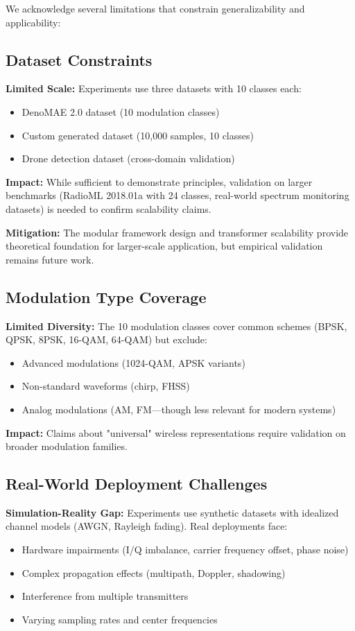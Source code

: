 We acknowledge several limitations that constrain generalizability and applicability:

\subsection{Dataset Constraints}

\textbf{Limited Scale:} Experiments use three datasets with 10 classes each:
\begin{itemize}
    \item DenoMAE 2.0 dataset (10 modulation classes)
    \item Custom generated dataset (10,000 samples, 10 classes)
    \item Drone detection dataset (cross-domain validation)
\end{itemize}

\textbf{Impact:} While sufficient to demonstrate principles, validation on larger benchmarks (RadioML 2018.01a with 24 classes, real-world spectrum monitoring datasets) is needed to confirm scalability claims.

\textbf{Mitigation:} The modular framework design and transformer scalability provide theoretical foundation for larger-scale application, but empirical validation remains future work.

\subsection{Modulation Type Coverage}

\textbf{Limited Diversity:} The 10 modulation classes cover common schemes (BPSK, QPSK, 8PSK, 16-QAM, 64-QAM) but exclude:
\begin{itemize}
    \item Advanced modulations (1024-QAM, APSK variants)
    \item Non-standard waveforms (chirp, FHSS)
    \item Analog modulations (AM, FM—though less relevant for modern systems)
\end{itemize}

\textbf{Impact:} Claims about "universal" wireless representations require validation on broader modulation families.

\subsection{Real-World Deployment Challenges}

\textbf{Simulation-Reality Gap:} Experiments use synthetic datasets with idealized channel models (AWGN, Rayleigh fading). Real deployments face:
\begin{itemize}
    \item Hardware impairments (I/Q imbalance, carrier frequency offset, phase noise)
    \item Complex propagation effects (multipath, Doppler, shadowing)
    \item Interference from multiple transmitters
    \item Varying sampling rates and center frequencies
\end{itemize}

